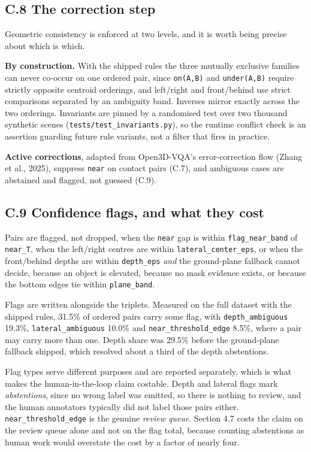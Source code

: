 \subsection{C.8 The correction step}

Geometric consistency is enforced at two levels, and it is worth being precise about which is which.

\textbf{By construction.} With the shipped rules the three mutually exclusive families can never co-occur on one ordered pair, since \texttt{on(A,B)} and \texttt{under(A,B)} require strictly opposite centroid orderings, and left/right and front/behind use strict comparisons separated by an ambiguity band. Inverses mirror exactly across the two orderings. Invariants are pinned by a randomised test over two thousand synthetic scenes (\texttt{tests/test\_\allowbreak{}invariants.py}), so the runtime conflict check is an assertion guarding future rule variants, not a filter that fires in practice.

\textbf{Active corrections}, adapted from Open3D-VQA's error-correction flow (Zhang et al., 2025), suppress \texttt{near} on contact pairs (C.7), and ambiguous cases are abstained and flagged, not guessed (C.9).

\subsection{C.9 Confidence flags, and what they cost}

Pairs are flagged, not dropped, when the \texttt{near} gap is within \texttt{flag\_\allowbreak{}near\_\allowbreak{}band} of \texttt{near\_\allowbreak{}T}, when the left/right centres are within \texttt{lateral\_\allowbreak{}center\_\allowbreak{}eps}, or when the front/behind depths are within \texttt{depth\_\allowbreak{}eps} \textit{and} the ground-plane fallback cannot decide, because an object is elevated, because no mask evidence exists, or because the bottom edges tie within \texttt{plane\_\allowbreak{}band}.

Flags are written alongside the triplets. Measured on the full dataset with the shipped rules, 31.5\% of ordered pairs carry some flag, with \texttt{depth\_\allowbreak{}ambiguous} 19.3\%, \texttt{lateral\_\allowbreak{}ambiguous} 10.0\% and \texttt{near\_\allowbreak{}threshold\_\allowbreak{}edge} 8.5\%, where a pair may carry more than one. Depth share was 29.5\% before the ground-plane fallback shipped, which resolved about a third of the depth abstentions.

Flag types serve different purposes and are reported separately, which is what makes the human-in-the-loop claim costable. Depth and lateral flags mark \textit{abstentions}, since no wrong label was emitted, so there is nothing to review, and the human annotators typically did not label those pairs either. \texttt{near\_\allowbreak{}threshold\_\allowbreak{}edge} is the genuine \textit{review queue}. Section 4.7 costs the claim on the review queue alone and not on the flag total, because counting abstentions as human work would overstate the cost by a factor of nearly four.

